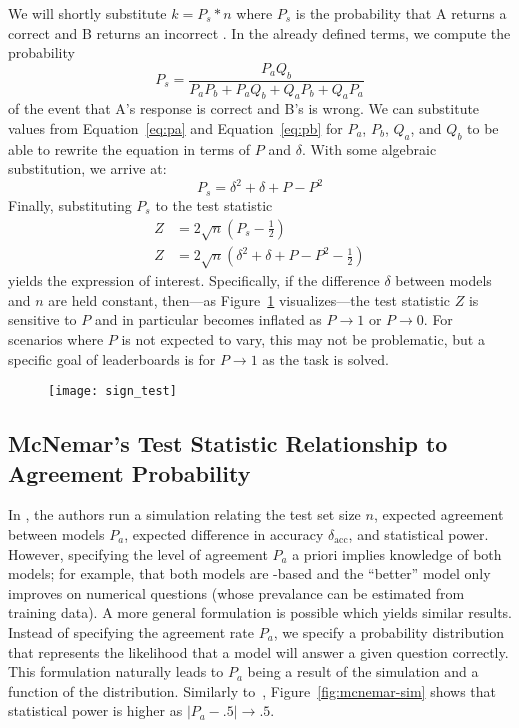 We will shortly substitute $k=P_s*n$ where $P_s$ is the probability that \subj{} A returns a correct \resp{} and \subj{} B returns an incorrect \resp{}.
In the already defined terms, we compute the probability
\begin{equation}
    P_s=\frac{P_aQ_b}{P_aP_b+P_aQ_b+Q_aP_b+Q_aP_a}
\end{equation}
of the event that \subj{} A's response is correct and B's is wrong.
We can substitute values from Equation~\ref{eq:pa} and Equation~\ref{eq:pb} for $P_a$, $P_b$, $Q_a$, and $Q_b$ to be able to rewrite the equation in terms of $P$ and $\delta$.
With some algebraic substitution, we arrive at:
\begin{equation}
    P_s = \delta^2+\delta + P - P^2
\end{equation}
\noindent
Finally, substituting $P_s$ to the test statistic
\begin{align}
    Z & =2\sqrt{n}(P_s - \frac{1}{2})                       \\
    Z & =2\sqrt{n}(\delta^2+\delta + P - P^2 - \frac{1}{2})
\end{align}
yields the expression of interest.
Specifically, if the difference $\delta$ between models and $n$ are held constant, then---as Figure~\ref{fig:sign-test} visualizes---the test statistic $Z$ is sensitive to $P$ and in particular becomes inflated as $P\rightarrow 1$ or $P\rightarrow 0$.
For scenarios where $P$ is not expected to vary, this may not be problematic, but a specific goal of leaderboards is for $P\rightarrow 1$ as the task is solved.

\begin{figure}[t]
    \centering
    \texttt{[image: sign\_test]}
    \caption{
    }
    \label{fig:sign-test}
\end{figure}

\subsection{McNemar's Test Statistic Relationship to Agreement Probability}
\label{ch:isicle:apx:mcnemar}

In \citet{card2020power}, the authors run a simulation relating the test set size $n$, expected agreement between models $P_a$, expected difference in accuracy $\delta_{\text{acc}}$, and statistical power.
However, specifying the level of agreement $P_a$ a priori implies knowledge of both models; for example, that both models are \bert{}-based and the ``better'' model only improves on numerical questions (whose prevalance can be estimated from training data).
A more general formulation is possible which yields similar results.
Instead of specifying the agreement rate $P_a$, we specify a probability distribution that represents the likelihood that a model will answer a given question correctly.
This formulation naturally leads to $P_a$ being a result of the simulation and a function of the distribution.
Similarly to~\citet{card2020power}, Figure~\ref{fig:mcnemar-sim} shows that statistical power is higher as $|P_a-.5|\rightarrow .5$.

